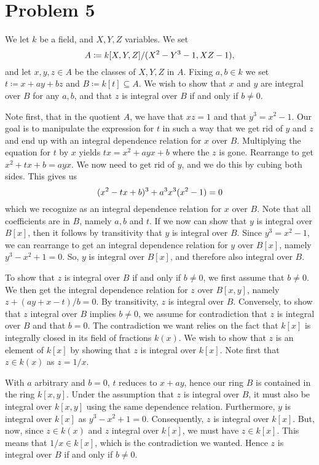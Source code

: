 \documentclass{article}
\begin{document}
\section*{Problem 5}
We let $k$ be a field, and $X, Y, Z$ variables. We set
\begin{equation}
    \notag
    A \coloneqq k[X, Y, Z] / (X^2- Y^3 - 1, XZ - 1), 
\end{equation}
and let $x, y, z \in A$ be the classes of $X, Y, Z$ in $A$. Fixing $a, b \in k$
we set $t \coloneqq x + ay + bz$ and $B \coloneqq k[t] \subseteq A$. We wish to
show that $x$ and $y$ are integral over $B$ for any $a, b$, and that $z$ is
integral over $B$ if and only if $b \neq 0$.

Note first, that in the quotient $A$, we have that $xz = 1$ and that $y^3 = x^2
- 1$. Our goal is to manipulate the expression for $t$ in such a way that we
get rid of $y$ and $z$ and end up with an integral dependence relation for $x$
over $B$. Multiplying the equation for $t$ by $x$ yields $tx = x^2 + ayx + b$
where the $z$ is gone. Rearrange to get $x^2 + tx + b = ayx$. We now need to
get rid of $y$, and we do this by cubing both sides. This gives us
\begin{equation}
    \notag
    (x^2 - tx + b)^3 + a^3x^3(x^2 - 1) = 0
\end{equation}
which we recognize as an integral dependence relation for $x$ over $B$. Note
that all coefficients are in $B$, namely $a, b$ and $t$. If we now can show
that $y$ is integral over $B[x]$, then it follows by transitivity that $y$ is
integral over $B$. Since $y^3 = x^2 - 1$, we can rearrange to get an integral
dependence relation for $y$ over $B[x]$, namely $y^3 - x^2 + 1 = 0$. So, $y$ is
integral over $B[x]$, and therefore also integral over $B$.

To show that $z$ is integral over $B$ if and only if $b \neq 0$, we first
assume that $b\neq 0$. We then get the integral dependence relation for $z$
over $B[x, y]$, namely $z + (a y + x - t) / b = 0$. By transitivity, $z$ is
integral over $B$. Conversely, to show that $z$ integral over $B$ implies $b
\neq 0$, we assume for contradiction that $z$ is integral over $B$ and that $b
= 0$. The contradiction we want relies on the fact that $k[x]$ is integrally
closed in its field of fractions $k(x)$. We wish to show that $z$ is an element
of $k[x]$ by showing that $z$ is integral over $k[x]$. Note first that $z \in
k(x)$ as $z = 1 / x$. 

With $a$ arbitrary and $b = 0$, $t$ reduces to $x + ay$, hence our ring $B$ is
contained in the ring $k[x, y]$. Under the assumption that $z$ is integral over
$B$, it must also be integral over $k[x, y]$ using the same dependence
relation. Furthermore, $y$ is integral over $k[x]$ as $y^3 - x^2 + 1 = 0$.
Consequently, $z$ is integral over $k[x]$. But, now, since $z \in k(x)$ and $z$
integral over $k[x]$, we must have $z \in k[x]$. This means that $1 / x \in
k[x]$, which is the contradiction we wanted. Hence $z$ is integral over $B$ if
and only if $b \neq 0$.
 
\end{document}
